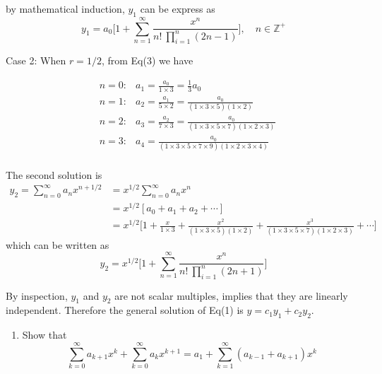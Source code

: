 \begin{solution}
    by mathematical induction, $y_1$ can be express as 
    \[
        y_1 = a_0 \biggl[1 + \sum_{n=1}^{\infty} \frac{x^n}{n! \> \prod_{i=1}^{n} (2n-1) }\biggr],\quad  n \in \mathbb{Z}^+
    \]


    Case 2: When $r = 1/2$, from Eq(3) we have

    \begin{align*}
        &n = 0: &a_1 = \frac{a_0}{1 \times 3} = \frac{1}{3}a_0\\
        &n = 1: &a_2 = \frac{a_1}{5 \times 2} = \frac{a_0}{(1 \times 3 \times 5)(1 \times 2)}\\
        &n = 2: &a_3 = \frac{a_2}{7 \times 3} = \frac{a_0}{(1 \times 3 \times 5 \times 7)(1\times 2 \times 3)}\\
        &n = 3: &a_4 
        = \frac{a_0}{(1 \times 3 \times 5 \times 7 \times 9)(1 \times 2 \times 3 \times 4)}\\
    \end{align*}

    The second solution is 
    \begin{align*}
        y_2 = \sum^\infty_{n=0} a_n x^{n+1/2} &= x^{1/2} \sum^\infty_{n=0} a_n x^n\\
        &= x^{1/2} [a_0 + a_1 + a_2 + \cdots]\\
        &= x^{1/2} \biggl[1 + \frac{x}{1 \times 3} + \frac{x^2}{(1\times 3 \times 5)(1 \times 2) 
        } + \frac{x^3}{(1 \times 3 \times 5 \times 7) (1 \times 2 \times 3)} + \cdots\biggr]
    \end{align*}
    which can be written as 
    \[
        y_2 = x^{1/2} \biggl[1 + \sum_{n=1}^{\infty} \frac{x^n}{n! \> \prod_{i=1}^{n} (2n+1) }\biggr]
    \]

    By inspection, $y_1$ and $y_2$ are not scalar multiples, implies that they are linearly independent.
    Therefore the general solution of Eq(1) is $y = c_1y_1 + c_2y_2$.
\end{solution}

\begin{example}
    \begin{enumerate}
        \item Show that
        \[
            \sum^\infty_{k=0} a_{k+1}x^k + \sum^\infty_{k=0} a_kx^{k+1} = a_1 + \sum^\infty_{k=1} (a_{k-1} +
            a_{k+1})x^k
        \]
    \end{enumerate}
\end{example}
\begin{solution}
    
\end{solution}